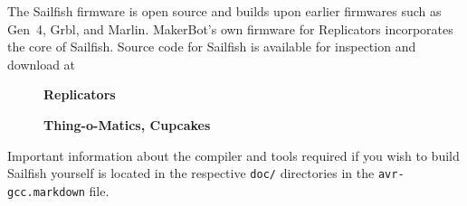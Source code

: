 The Sailfish firmware is open source and builds upon earlier firmwares such as Gen~4, Grbl, and Marlin.  MakerBot's own firmware for Replicators incorporates the core of Sailfish.  Source code for Sailfish is available for inspection and download at

\begin{description}
\item[] \textbf{Replicators}\
\newline
{}
\item[] \textbf{Thing-o-Matics, Cupcakes}\newline
{}
\end{description}

\noindent Important information about the compiler and tools required if you wish to build Sailfish yourself is located in the respective \texttt{doc/} directories in the \texttt{avr-gcc.markdown} file.
